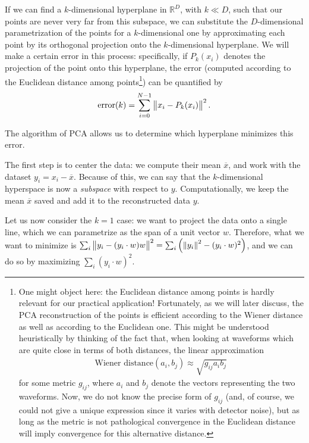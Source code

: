 \documentclass[main.tex]{subfiles}
\begin{document}
If we can find a \(k\)-dimensional hyperplane in \(\mathbb{R}^{D}\), with \(k \ll D\), such that our points are never very far from this subspace, we can substitute the \(D\)-dimensional parametrization of the points for a \(k\)-dimensional one by approximating each point by its orthogonal projection onto the \(k\)-dimensional hyperplane. 
We will make a certain error in this process: specifically, if \(P_k(x_{i})\) denotes the projection of the point onto this hyperplane, the error (computed according to the Euclidean distance among points\footnote{One might object here: the Euclidean distance among points is hardly relevant for our practical application! Fortunately, as we will later discuss, the PCA reconstruction of the points is efficient according to the Wiener distance as well as according to the Euclidean one. This might be understood heuristically by thinking of the fact that, when looking at waveforms which are quite close in terms of both distances, the linear approximation 
%
\begin{align}
\text{Wiener distance}(a_i, b_j) \approx \sqrt{g_{ij} a_{i} b_j }
\,
\end{align}
%
for some metric \(g_{ij}\), where \(a_i\) and \(b_j\) denote the vectors representing the two waveforms. Now, we do not know the precise form of \(g_{ij}\) (and, of course, we could not give a unique expression since it varies with detector noise), but as long as the metric is not pathological convergence in the Euclidean distance will imply convergence for this alternative distance. 
}) can be quantified by
%
\begin{align}
\text{error} (k) = \sum _{i=0}^{N-1} \norm{x_i - P_k(x_i)}^2
\,.
\end{align}

The algorithm of PCA allows us to determine which hyperplane minimizes this error. 

The first step is to center the data: we compute their mean \(\overline{x}\), and work with the dataset \(y_i = x_i - \overline{x}\). 
Because of this, we can say that the \(k\)-dimensional hyperspace is now a \emph{subspace} with respect to \(y\). 
Computationally, we keep the mean \(\overline{x}\) saved and add it to the reconstructed data \(y\). 

Let us now consider the \(k=1\) case: we want to project the data onto a single line, which we can parametrize as the span of a unit vector \(w\).
Therefore, what we want to minimize is \(\sum _{i} \norm{y_i - (y_i \cdot w) w}^2 = \sum _{i} \qty( \norm{y_i}^2 - (y_i \cdot w)^2)\), and we can do so by maximizing \(\sum _{i} (y_i \cdot w)^2\). 
\end{document}
